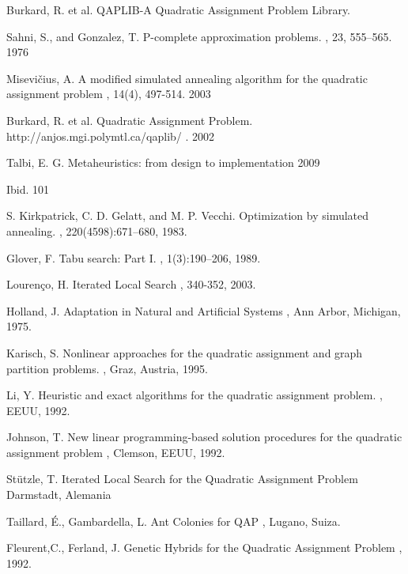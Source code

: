 \documentclass{ci5652}
\begin{document}
\begin{thebibliography}{99}

Burkard, R. et al.
\newblock QAPLIB-A Quadratic Assignment Problem Library.

Sahni, S., and Gonzalez, T.
\newblock P-complete approximation problems.
, 23, 555–565. 1976

Misevičius, A.
\newblock A modified simulated annealing algorithm for the quadratic assignment problem
, 14(4), 497-514. 2003

Burkard, R. et al.
\newblock Quadratic Assignment Problem.
\newblock http://anjos.mgi.polymtl.ca/qaplib/ . 2002

Talbi, E. G. 
\newblock Metaheuristics: from design to implementation
 2009

Ibid. 101

S. Kirkpatrick, C. D. Gelatt, and M. P. Vecchi. 
\newblock Optimization by simulated annealing.
, 220(4598):671–680, 1983.

Glover, F. 
\newblock Tabu search: Part I. 
, 1(3):190–206, 1989.

Lourenço, H.
\newblock Iterated Local Search
, 340-352, 2003.

Holland, J.
\newblock Adaptation in Natural and Artificial Systems 
, Ann Arbor, Michigan, 1975.

Karisch, S. 
\newblock Nonlinear approaches for the quadratic assignment and graph partition problems.
, Graz, Austria, 1995.

Li, Y.
\newblock Heuristic and exact algorithms for the quadratic assignment problem.
, EEUU, 1992.

Johnson, T.
\newblock New linear programming-based solution procedures for the quadratic assignment problem
, Clemson, EEUU, 1992.

Stützle, T.
\newblock Iterated Local Search for the Quadratic Assignment Problem
\newblock Darmstadt, Alemania

Taillard, É., Gambardella, L.
\newblock Ant Colonies for QAP
, Lugano, Suiza.

Fleurent,C., Ferland, J.
\newblock Genetic Hybrids for the Quadratic Assignment Problem
, 1992.

\end{thebibliography}
\end{document}
